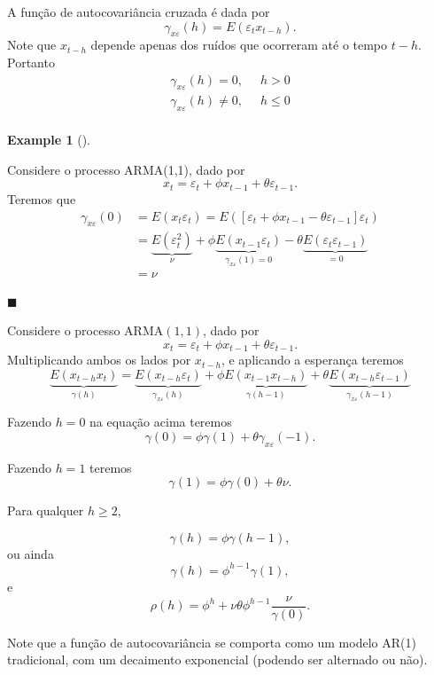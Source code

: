\documentclass[
  letterpaper,
  DIV=11,
  numbers=noendperiod]{scrartcl}
\theoremstyle{plain}
\theoremstyle{plain}
\theoremstyle{definition}
\newtheorem{example}{Example}[chapter]
\theoremstyle{definition}
\theoremstyle{remark}
\begin{document}
A função de autocovariância cruzada é dada por \[\begin{equation}
      \gamma_{x\varepsilon}(h)=E(\varepsilon_t x_{t-h}).
    \end{equation}\] Note que \(x_{t-h}\) depende apenas dos ruídos que
ocorreram até o tempo \(t-h\). Portanto \[\begin{align}
     \gamma_{x\varepsilon}(h)=0,&\;\; h>0 \\
     \gamma_{x\varepsilon}(h)\neq 0,&\;\; h\leq 0 \\
    \end{align}\]

\begin{example}[]\protect\hypertarget{exm-}{}\label{exm-}

Considere o processo ARMA(1,1), dado por
\[x_t = \varepsilon_{t} + \phi x_{t-1} + \theta\varepsilon_{t-1}.\]
Teremos que \[\begin{align*}
\gamma_{x\varepsilon}(0)&=E(x_t\varepsilon_t) = E( \left[\varepsilon_t + \phi x_{t-1} - \theta\varepsilon_{t-1} \right]\varepsilon_t)\\
&=\underbrace{E(\varepsilon_t^2)}_{\nu}+ \phi\underbrace{ E(x_{t-1}\varepsilon_t)}_{\gamma_{x\varepsilon}(1)=0} -\theta \underbrace{E(\varepsilon_{t}\varepsilon_{t-1})}_{=0} \\
&=\nu
\end{align*}\]

\(\blacksquare\)

\end{example}

Considere o processo ARMA\((1,1)\), dado por
\[x_t = \varepsilon_{t} + \phi x_{t-1} + \theta\varepsilon_{t-1}.\]
Multiplicando ambos os lados por \(x_{t-h}\), e aplicando a esperança
teremos \[
    \underbrace{E(x_{t-h}x_t)}_{\gamma(h)} = \underbrace{E(x_{t-h}\varepsilon_{t})}_{\gamma_{x\varepsilon}(h)} + \phi \underbrace{E(x_{t-1}x_{t-h})}_{\gamma(h-1)} + \theta \underbrace{E(x_{t-h}\varepsilon_{t-1})}_{\gamma_{x\varepsilon}(h-1)}
    \]

Fazendo \(h=0\) na equação acima teremos
\[\gamma(0)=\phi\gamma(1) + \theta\gamma_{x\varepsilon}(-1).\]

Fazendo \(h=1\) teremos \[\gamma(1)=\phi\gamma(0)+\theta\nu.\]

Para qualquer \(h\geq 2\),

\[\gamma(h)=\phi\gamma(h-1),\] ou ainda
\[\gamma(h)=\phi^{h-1}\gamma(1),\] e
\[\rho(h)=\phi^h+\nu\theta\phi^{h-1}\frac{\nu}{\gamma(0)}.\]

Note que a função de autocovariância se comporta como um modelo AR(1)
tradicional, com um decaimento exponencial (podendo ser alternado ou
não).
\end{document}
